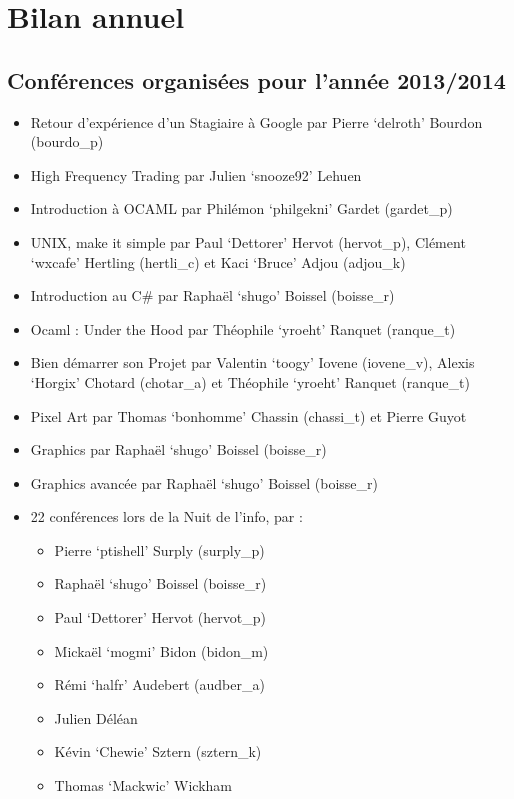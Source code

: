 \documentclass[12pt]{report}
\begin{document}
  \section{Bilan annuel}
  \subsection{Conférences organisées pour l'année 2013/2014}
  \begin{itemize}
    \item Retour d'expérience d'un Stagiaire à Google par Pierre `delroth' Bourdon (bourdo\_p)
    \item High Frequency Trading par Julien `snooze92' Lehuen
    \item Introduction à OCAML par Philémon `philgekni' Gardet (gardet\_p)
    \item UNIX, make it simple par Paul `Dettorer' Hervot (hervot\_p), Clément `wxcafe' Hertling (hertli\_c) et Kaci `Bruce' Adjou (adjou\_k)
    \item Introduction au C\# par Raphaël `shugo' Boissel (boisse\_r)
    \item Ocaml : Under the Hood par Théophile `yroeht' Ranquet (ranque\_t)
    \item Bien démarrer son Projet par Valentin `toogy' Iovene (iovene\_v), Alexis `Horgix' Chotard (chotar\_a) et Théophile `yroeht' Ranquet (ranque\_t)
    \item Pixel Art par Thomas `bonhomme' Chassin (chassi\_t) et Pierre Guyot
    \item Graphics par Raphaël `shugo' Boissel (boisse\_r)
    \item Graphics avancée par Raphaël `shugo' Boissel (boisse\_r)
    \item 22 conférences lors de la Nuit de l'info, par : \\
      \begin{itemize}
        \item Pierre `ptishell' Surply (surply\_p)
        \item Raphaël `shugo' Boissel (boisse\_r)
        \item Paul `Dettorer' Hervot (hervot\_p)
        \item Mickaël `mogmi' Bidon (bidon\_m)
        \item Rémi `halfr' Audebert (audber\_a)
        \item Julien Déléan
        \item Kévin `Chewie' Sztern (sztern\_k)
        \item Thomas `Mackwic' Wickham

\end{itemize}
\end{itemize}
\end{document}
